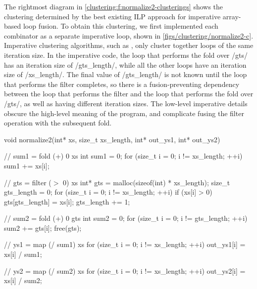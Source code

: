The rightmost diagram in \cref{clustering:f:normalize2-clusterings} shows the clustering determined by the best existing ILP approach for imperative array-based loop fusion.
To obtain this clustering, we first implemented each combinator as a separate imperative loop, shown in \cref{figs/clustering/normalize2-c}.
Imperative clustering algorithms, such as \citet{megiddo1998optimal}, only cluster together loops of the same iteration size.
In the imperative code, the loop that performs the fold over \Hs/gts/ has an iteration size of \Hs/gts_length/, while all the other loops have an iteration size of \Hs/xs_length/.
The final value of \Hs/gts_length/ is not known until the loop that performs the filter completes, so there is a fusion-preventing dependency between the loop that performs the filter and the loop that performs the fold over \Hs/gts/, as well as having different iteration sizes.
The low-level imperative details obscure the high-level meaning of the program, and complicate fusing the filter operation with the subsequent fold.

\begin{listing-c}[float,label=figs/clustering/normalize2-c,caption=Unfused imperative implementation of \Hs/normalize2/]
void normalize2(int* xs, size_t xs_length, int* out_ys1, int* out_ys2)
{
    // sum1 = fold (+) 0 xs
    int sum1 = 0;
    for (size_t i = 0; i != xs_length; ++i) {
        sum1 += xs[i];
    }

    // gts = filter ($>$ 0) xs
    int* gts = malloc(sizeof(int) * xs_length);
    size_t gts_length = 0;
    for (size_t i = 0; i != xs_length; ++i) {
        if (xs[i] > 0) {
            gts[gts_length] = xs[i];
            gts_length += 1;
        }
    }

    // sum2 = fold (+) 0 gts
    int sum2 = 0;
    for (size_t i = 0; i != gts_length; ++i) {
        sum2 += gts[i];
    }
    free(gts);

    // ys1 = map (/ sum1) xs
    for (size_t i = 0; i != xs_length; ++i) {
        out_ys1[i] = xs[i] / sum1;
    }

    // ys2 = map (/ sum2) xs
    for (size_t i = 0; i != xs_length; ++i) {
        out_ys2[i] = xs[i] / sum2;
    }
}
\end{listing-c}

